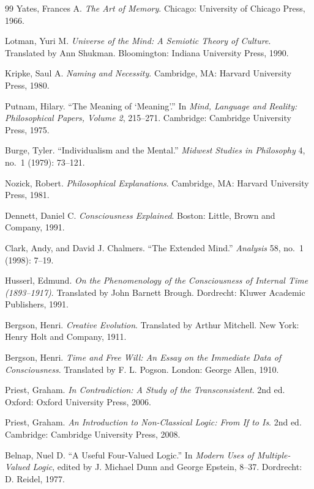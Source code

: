 \documentclass[
  11pt,
  a4paper,
  DIV=12,
  BCOR=0mm,
  parskip=half-
]{scrartcl}
\theoremstyle{definition}
\theoremstyle{plain}
\theoremstyle{remark}
\begin{document}
\begin{thebibliography}{99}
Yates, Frances A.
\emph{The Art of Memory}.
Chicago: University of Chicago Press, 1966.

Lotman, Yuri M.
\emph{Universe of the Mind: A Semiotic Theory of Culture}.
Translated by Ann Shukman.
Bloomington: Indiana University Press, 1990.

Kripke, Saul A.
\emph{Naming and Necessity}.
Cambridge, MA: Harvard University Press, 1980.

Putnam, Hilary.
``The Meaning of `Meaning'.''
In \emph{Mind, Language and Reality: Philosophical Papers, Volume 2},
215--271.
Cambridge: Cambridge University Press, 1975.

Burge, Tyler.
``Individualism and the Mental.''
\emph{Midwest Studies in Philosophy}
4, no.~1 (1979): 73--121.

Nozick, Robert.
\emph{Philosophical Explanations}.
Cambridge, MA: Harvard University Press, 1981.

Dennett, Daniel C.
\emph{Consciousness Explained}.
Boston: Little, Brown and Company, 1991.

Clark, Andy, and David J. Chalmers.
``The Extended Mind.''
\emph{Analysis}
58, no.~1 (1998): 7--19.

Husserl, Edmund.
\emph{On the Phenomenology of the Consciousness of Internal Time
(1893--1917)}.
Translated by John Barnett Brough.
Dordrecht: Kluwer Academic Publishers, 1991.

Bergson, Henri.
\emph{Creative Evolution}.
Translated by Arthur Mitchell.
New York: Henry Holt and Company, 1911.

Bergson, Henri.
\emph{Time and Free Will: An Essay on the Immediate Data of Consciousness}.
Translated by F. L. Pogson.
London: George Allen, 1910.

Priest, Graham.
\emph{In Contradiction: A Study of the Transconsistent}.
2nd ed.
Oxford: Oxford University Press, 2006.

Priest, Graham.
\emph{An Introduction to Non-Classical Logic: From If to Is}.
2nd ed.
Cambridge: Cambridge University Press, 2008.

Belnap, Nuel D.
``A Useful Four-Valued Logic.''
In \emph{Modern Uses of Multiple-Valued Logic},
edited by J. Michael Dunn and George Epstein, 8--37.
Dordrecht: D. Reidel, 1977.


\end{thebibliography}
\end{document}
